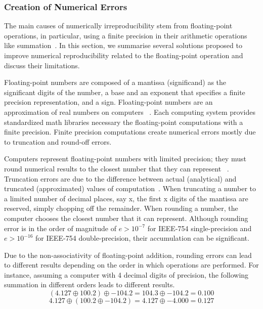 \subsubsection{Creation of Numerical Errors}

The main causes of numerically irreproducibility stem from
floating-point operations, in particular, using a finite precision in 
their arithmetic operations like summation~\cite{hill2017numerical, 
taufer2010improving}. In this section, we summarise several solutions proposed 
to improve numerical reproducibility related to the floating-point 
operation and discuss their limitations. 

Floating-point numbers are composed of a mantissa (significand) as the 
significant digits of the number, a base and an exponent that specifies 
a finite precision representation, and a sign.
Floating-point numbers are an approximation of real 
numbers on computers 
~\cite{hill2017numerical}. Each computing system provides 
standardized math libraries necessary the floating-point 
computations with a finite precision. Finite precision 
computations create numerical errors mostly due to truncation and 
round-off errors. 

Computers represent floating-point numbers with limited precision;
they must round numerical results to the closest number that they can represent
~\cite{fadnavis1998some}. 
Truncation errors are due to the difference between actual (analytical) and
truncated (approximated) values of computation~\cite{kiusalaas2013numerical}.
When truncating a number to a limited number of decimal places, say x, the first x digits
of the mantissa are reserved, simply chopping off the remainder.
When rounding a number, the computer chooses the closest number that it can represent.
Although rounding error is in the order of magnitude of $e>10^{-7}$ for IEEE-754 single-precision
and $e>10^{-16}$ for IEEE-754 double-precision, their accumulation can be significant. 

Due to the non-associativity of floating-point addition, 
rounding errors can lead to different results depending on the order in 
which operations are performed. For instance, assuming 
a computer with 4 decimal digits of precision, the following summation 
in different orders leads to different results.
\[
(4.127 \oplus 100.2) \oplus -104.2 = 104.3 \oplus -104.2 = 0.100
\]
\[
4.127 \oplus (100.2 \oplus -104.2) = 4.127 \oplus -4.000 = 0.127
\]


